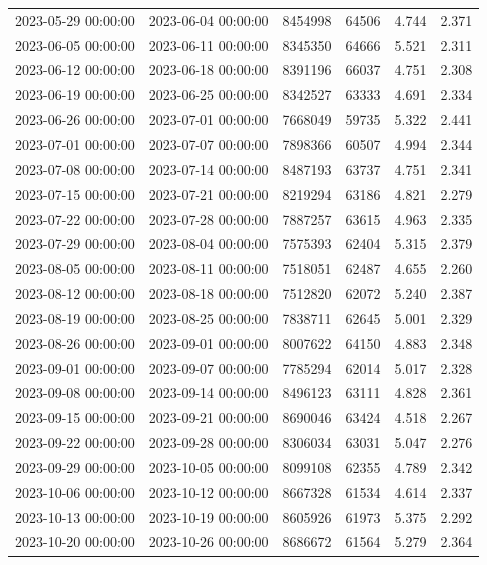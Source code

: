 \begin{tabular}{llrrrr}
2023-05-29 00:00:00 & 2023-06-04 00:00:00 & 8454998 & 64506 & 4.744 & 2.371 \\
2023-06-05 00:00:00 & 2023-06-11 00:00:00 & 8345350 & 64666 & 5.521 & 2.311 \\
2023-06-12 00:00:00 & 2023-06-18 00:00:00 & 8391196 & 66037 & 4.751 & 2.308 \\
2023-06-19 00:00:00 & 2023-06-25 00:00:00 & 8342527 & 63333 & 4.691 & 2.334 \\
2023-06-26 00:00:00 & 2023-07-01 00:00:00 & 7668049 & 59735 & 5.322 & 2.441 \\
2023-07-01 00:00:00 & 2023-07-07 00:00:00 & 7898366 & 60507 & 4.994 & 2.344 \\
2023-07-08 00:00:00 & 2023-07-14 00:00:00 & 8487193 & 63737 & 4.751 & 2.341 \\
2023-07-15 00:00:00 & 2023-07-21 00:00:00 & 8219294 & 63186 & 4.821 & 2.279 \\
2023-07-22 00:00:00 & 2023-07-28 00:00:00 & 7887257 & 63615 & 4.963 & 2.335 \\
2023-07-29 00:00:00 & 2023-08-04 00:00:00 & 7575393 & 62404 & 5.315 & 2.379 \\
2023-08-05 00:00:00 & 2023-08-11 00:00:00 & 7518051 & 62487 & 4.655 & 2.260 \\
2023-08-12 00:00:00 & 2023-08-18 00:00:00 & 7512820 & 62072 & 5.240 & 2.387 \\
2023-08-19 00:00:00 & 2023-08-25 00:00:00 & 7838711 & 62645 & 5.001 & 2.329 \\
2023-08-26 00:00:00 & 2023-09-01 00:00:00 & 8007622 & 64150 & 4.883 & 2.348 \\
2023-09-01 00:00:00 & 2023-09-07 00:00:00 & 7785294 & 62014 & 5.017 & 2.328 \\
2023-09-08 00:00:00 & 2023-09-14 00:00:00 & 8496123 & 63111 & 4.828 & 2.361 \\
2023-09-15 00:00:00 & 2023-09-21 00:00:00 & 8690046 & 63424 & 4.518 & 2.267 \\
2023-09-22 00:00:00 & 2023-09-28 00:00:00 & 8306034 & 63031 & 5.047 & 2.276 \\
2023-09-29 00:00:00 & 2023-10-05 00:00:00 & 8099108 & 62355 & 4.789 & 2.342 \\
2023-10-06 00:00:00 & 2023-10-12 00:00:00 & 8667328 & 61534 & 4.614 & 2.337 \\
2023-10-13 00:00:00 & 2023-10-19 00:00:00 & 8605926 & 61973 & 5.375 & 2.292 \\
2023-10-20 00:00:00 & 2023-10-26 00:00:00 & 8686672 & 61564 & 5.279 & 2.364 \\

\end{tabular}
